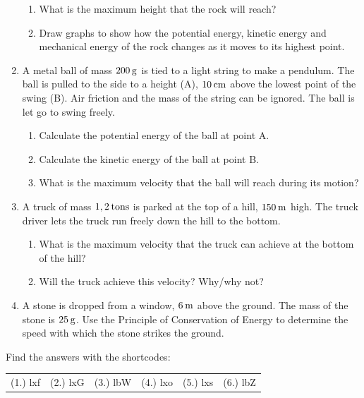 \begin{enumerate}[noitemsep, label=\textbf{\arabic*}. ]
\label{m38786*id71971}\begin{enumerate}[noitemsep, label=\textbf{\alph*}. ] 
            \label{m38786*uid133}\item What is the maximum height that the rock will reach?
\label{m38786*uid134}\item Draw graphs to show how the potential energy, kinetic energy and mechanical energy of the rock changes as it moves to its highest point.
\end{enumerate}
                  \label{m38786*uid135}\item A metal ball of mass $200\phantom{\rule{2pt}{0ex}}\mathrm{g}$ is tied to a light string to make a pendulum. The ball is pulled to the side to a height (A), $10\phantom{\rule{2pt}{0ex}}\mathrm{cm}$ above the lowest point of the swing (B). Air friction and the mass of the string can be ignored. The ball is let go to swing freely.
\label{m38786*id72026}\begin{enumerate}[noitemsep, label=\textbf{\alph*}. ] 
            \label{m38786*uid136}\item Calculate the potential energy of the ball at point A.
\label{m38786*uid137}\item Calculate the kinetic energy of the ball at point B.
\label{m38786*uid138}\item What is the maximum velocity that the ball will reach during its motion?
\end{enumerate}
                \label{m38786*uid139}\item A truck of mass $1,2\phantom{\rule{2pt}{0ex}}\mathrm{tons}$ is parked at the top of a hill, $150\phantom{\rule{2pt}{0ex}}\mathrm{m}$ high. The truck driver lets the truck run freely down the hill to the bottom.
\label{m38786*id72082}\begin{enumerate}[noitemsep, label=\textbf{\alph*}. ] 
            \label{m38786*uid140}\item What is the maximum velocity that the truck can achieve at the bottom of the hill?
\label{m38786*uid141}\item Will the truck achieve this velocity? Why/why not?
\end{enumerate}
                \label{m38786*uid142}\item A stone is dropped from a window, $6\phantom{\rule{2pt}{0ex}}\mathrm{m}$ above the ground. The mass of the stone is $25\phantom{\rule{2pt}{0ex}}\mathrm{g}$.
Use the Principle of Conservation of Energy to determine the speed with which the stone strikes the ground.
           \end{enumerate}
  \label{m38786**end}
  \label{1fc5ba69690764517c30802fdf7b1905**end}
\par {} Find the answers with the shortcodes:
 \par \begin{tabular}[h]{cccccc}
 (1.) lxf  &  (2.) lxG  &  (3.) lbW  &  (4.) lxo  &  (5.) lxs  &  (6.) lbZ  & \end{tabular}
